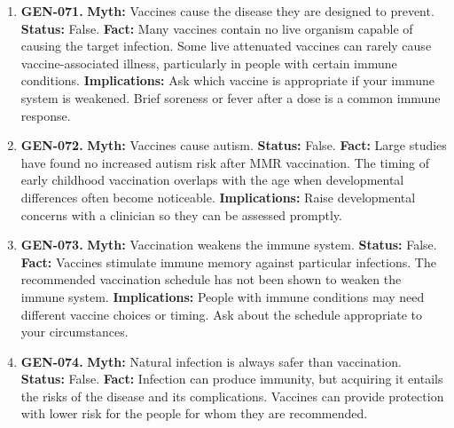 \documentclass[11pt,oneside]{book}
\begin{document}
\begin{enumerate}[leftmargin=0pt,labelwidth=0pt,labelsep=0pt,itemindent=0pt]
\textbf{Fact:} Antibiotics can prevent certain bacterial infections in defined settings, such as selected operations. They do not prevent every infection or protect against ordinary viral colds. \cite{ref294}\newline
\textbf{Implications:} Use preventive antibiotics only for the indication and duration prescribed.
\item[] \textbf{GEN-071.} \textbf{Myth:} Vaccines cause the disease they are designed to prevent.\newline
\textbf{Status:} False.\newline
\textbf{Fact:} Many vaccines contain no live organism capable of causing the target infection. Some live attenuated vaccines can rarely cause vaccine-associated illness, particularly in people with certain immune conditions. \cite{ref314}\newline
\textbf{Implications:} Ask which vaccine is appropriate if your immune system is weakened. Brief soreness or fever after a dose is a common immune response.
\item[] \textbf{GEN-072.} \textbf{Myth:} Vaccines cause autism.\newline
\textbf{Status:} False.\newline
\textbf{Fact:} Large studies have found no increased autism risk after MMR vaccination. The timing of early childhood vaccination overlaps with the age when developmental differences often become noticeable. \cite{ref1,ref2}\newline
\textbf{Implications:} Raise developmental concerns with a clinician so they can be assessed promptly.
\item[] \textbf{GEN-073.} \textbf{Myth:} Vaccination weakens the immune system.\newline
\textbf{Status:} False.\newline
\textbf{Fact:} Vaccines stimulate immune memory against particular infections. The recommended vaccination schedule has not been shown to weaken the immune system. \cite{ref314}\newline
\textbf{Implications:} People with immune conditions may need different vaccine choices or timing. Ask about the schedule appropriate to your circumstances.
\item[] \textbf{GEN-074.} \textbf{Myth:} Natural infection is always safer than vaccination.\newline
\textbf{Status:} False.\newline
\textbf{Fact:} Infection can produce immunity, but acquiring it entails the risks of the disease and its complications. Vaccines can provide protection with lower risk for the people for whom they are recommended. \cite{ref314}\newline

\end{enumerate}
\end{document}
